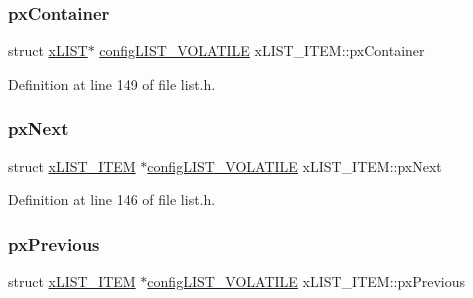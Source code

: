 \subsubsection{\texorpdfstring{px\+Container}{pxContainer}}
{\footnotesize\ttfamily struct \hyperlink{structx_l_i_s_t}{x\+L\+I\+ST}$\ast$ \hyperlink{vendor_2ceedling_2plugins_2freertos_2vendor_2freertos_2include_2list_8h_a2d5de557c5561c8980d1bf51d87d8cba}{config\+L\+I\+S\+T\+\_\+\+V\+O\+L\+A\+T\+I\+LE} x\+L\+I\+S\+T\+\_\+\+I\+T\+E\+M\+::px\+Container}



Definition at line 149 of file list.\+h.

\mbox{\label{structx_l_i_s_t___i_t_e_m_a9d3b501f7bb59030b137fe98b8e925e0}} 
\subsubsection{\texorpdfstring{px\+Next}{pxNext}}
{\footnotesize\ttfamily struct \hyperlink{structx_l_i_s_t___i_t_e_m}{x\+L\+I\+S\+T\+\_\+\+I\+T\+EM} $\ast$\hyperlink{vendor_2ceedling_2plugins_2freertos_2vendor_2freertos_2include_2list_8h_a2d5de557c5561c8980d1bf51d87d8cba}{config\+L\+I\+S\+T\+\_\+\+V\+O\+L\+A\+T\+I\+LE} x\+L\+I\+S\+T\+\_\+\+I\+T\+E\+M\+::px\+Next}



Definition at line 146 of file list.\+h.

\mbox{\label{structx_l_i_s_t___i_t_e_m_a28edb348dac62ec9f84df7ffc2ef8d81}} 
\subsubsection{\texorpdfstring{px\+Previous}{pxPrevious}}
{\footnotesize\ttfamily struct \hyperlink{structx_l_i_s_t___i_t_e_m}{x\+L\+I\+S\+T\+\_\+\+I\+T\+EM} $\ast$\hyperlink{vendor_2ceedling_2plugins_2freertos_2vendor_2freertos_2include_2list_8h_a2d5de557c5561c8980d1bf51d87d8cba}{config\+L\+I\+S\+T\+\_\+\+V\+O\+L\+A\+T\+I\+LE} x\+L\+I\+S\+T\+\_\+\+I\+T\+E\+M\+::px\+Previous}



